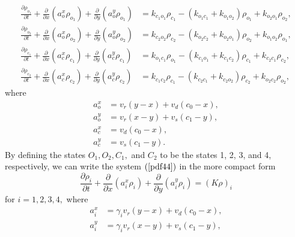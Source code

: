 \begin{align}
\frac{\partial\rho_{o_{1}}}{\partial t}+\frac{\partial}{\partial x}\left(
a_{o}^{x}\rho_{o_{1}}\right)  +\frac{\partial}{\partial y}\left(  a_{o}
^{y}\rho_{o_{1}}\right)   &  =k_{c_{1}o_{1}}\rho_{c_{1}}-\left(  k_{o_{1}
c_{1}}+k_{o_{1}o_{2}}\right)  \rho_{o_{1}}+k_{o_{2}o_{1}}\rho_{o_{2}
},\nonumber\\
\frac{\partial\rho_{o_{2}}}{\partial t}+\frac{\partial}{\partial x}\left(
a_{o}^{x}\rho_{o_{2}}\right)  +\frac{\partial}{\partial y}\left(  a_{o}
^{y}\rho_{o_{2}}\right)   &  =k_{c_{2}o_{2}}\rho_{c_{2}}-\left(  k_{o_{2}c_{2}
}+k_{o_{2}o_{1}}\right)  \rho_{o_{2}}+k_{o_{1}o_{2}}\rho_{o_{1}}
,\label{pdf44}\\
\frac{\partial\rho_{c_{1}}}{\partial t}+\frac{\partial}{\partial x}\left(
a_{c}^{x}\rho_{c_{1}}\right)  +\frac{\partial}{\partial y}\left(  a_{c}
^{y}\rho_{c_{1}}\right)   &  =k_{o_{1}c_{1}}\rho_{o_{1}}-\left(  k_{c_{1}
o_{1}}+k_{c_{1}c_{2}}\right)  \rho_{c_{1}}+k_{c_{2}c_{1}}\rho_{c_{2}
},\nonumber\\
\frac{\partial\rho_{c_{2}}}{\partial t}+\frac{\partial}{\partial x}\left(
a_{c}^{x}\rho_{c_{2}}\right)  +\frac{\partial}{\partial y}\left(  a_{c}
^{y}\rho_{c_{2}}\right)   &  =k_{c_{1}c_{2}}\rho_{c_{1}}-\left(  k_{c_{2}
c_{1}}+k_{c_{2}o_{2}}\right)  \rho_{c_{2}}+k_{o_{2}c_{2}}\rho_{o_{2}
},\nonumber
\end{align}
where 
\begin{align}
a_{o}^{x} &  =v_{r}\left(  y-x\right)  +v_{d}\left(  c_{0}-x\right)
,\nonumber\\
a_{o}^{y} &  =v_{r}\left(  x-y\right)  +v_{s}\left(  c_{1}-y\right)
,\label{flux44}\\
a_{c}^{x} &  =v_{d}\left(  c_{0}-x\right)  ,\nonumber\\
a_{c}^{y} &  =v_{s}\left(  c_{1}-y\right)  .\nonumber
\end{align}
By defining the states $O_{1},O_{2},C_{1},$ and $C_{2}$ to be the states 
1, 2, 3, and
4, respectively, we can write the system $(\ref{pdf44})$ in the more compact form
\begin{equation}
\frac{\partial\rho_{i}}{\partial t}+\frac{\partial}{\partial x}\left(
a_{i}^{x}\rho_{i}\right)  +\frac{\partial}{\partial y}\left(  a_{i}^{y}
\rho_{i}\right)  =\left(  K\rho\right)  _{i}\label{compact44}
\end{equation}
for $i=1,2,3,4,$ where
\begin{align*}
a_{i}^{x} &  =\gamma_{i}v_{r}\left(  y-x\right)  +v_{d}\left(  c_{0}-x\right)
,\\
a_{i}^{y} &  =\gamma_{i}v_{r}\left(  x-y\right)  +v_{s}\left(  c_{1}-y\right),
\end{align*}
